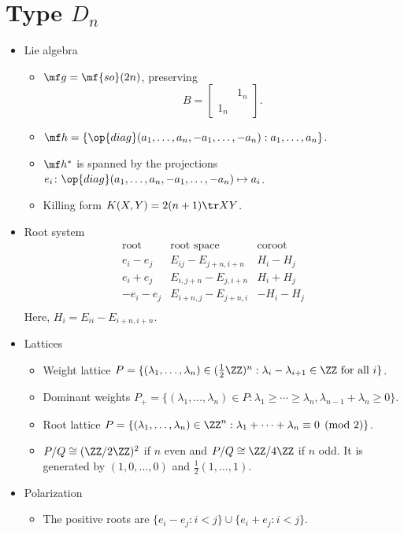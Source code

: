 \documentclass{article}
\begin{document}
\newpage
\section{Type \texorpdfstring{$D_n$}{ Dn}}
\begin{itemize}
	\item Lie algebra
	\begin{itemize}
		\item $\mf g=\mf{so}(2n)$, preserving
		\[B=\begin{bmatrix}
			& 1_n \\ 1_n
		\end{bmatrix}.\]
		\item $\mf h=\{\op{diag}(a_1,\ldots,a_n,-a_1,\ldots,-a_n):a_1,\ldots,a_n\}$.
		\item $\mf h^*$ is spanned by the projections $e_i\colon\op{diag}(a_1,\ldots,a_n,-a_1,\ldots,-a_n)\mapsto a_i$.
		\item Killing form $K(X,Y)=2(n+1)\tr XY$.\todo{}
	\end{itemize}
	\item Root system
	\[\begin{array}{c|cccccc}
		\text{root} & \text{root space} & \text{coroot} \\\hline
		e_i-e_j & E_{ij}-E_{j+n,i+n} & H_i-H_j \\
		e_i+e_j & E_{i,j+n}-E_{j,i+n} & H_i+H_j \\
		-e_i-e_j & E_{i+n,j}-E_{j+n,i} & -H_i-H_j \\
	\end{array}\]
	Here, $H_i=E_{ii}-E_{i+n,i+n}$.
	\item Lattices
	\begin{itemize}
		\item Weight lattice $P=\{(\lambda_1,\ldots,\lambda_{n})\in(\frac12\ZZ)^n:\lambda_i-\lambda_{i+1}\in\ZZ\text{ for all }i\}$.
		\item Dominant weights $P_+=\{(\lambda_1,\ldots,\lambda_n)\in P:\lambda_1\ge\cdots\ge\lambda_n,\lambda_{n-1}+\lambda_n\ge0\}$.
		\item Root lattice $P=\{(\lambda_1,\ldots,\lambda_{n})\in\ZZ^n:\lambda_1+\cdots+\lambda_n\equiv0\pmod2\}$.
		\item $P/Q\cong(\ZZ/2\ZZ)^2$ if $n$ even and $P/Q\cong\ZZ/4\ZZ$ if $n$ odd. It is generated by $(1,0,\ldots,0)$ and $\frac12(1,\ldots,1)$.
	\end{itemize}
	\item Polarization
	\begin{itemize}
		\item The positive roots are $\{e_i-e_j:i<j\}\cup\{e_i+e_j:i<j\}$.

\end{itemize}
\end{itemize}
\end{document}
